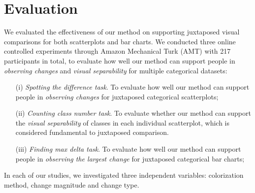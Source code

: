 \section {Evaluation}
\label{sec:results}

We evaluated the effectiveness of our method on supporting juxtaposed visual comparisons for both scatterplots and bar charts.%
We conducted three online controlled experiments through Amazon Mechanical Turk (AMT) with 217 participants in total, to evaluate how well our method can support people in \emph{observing changes} and \emph{visual separability} for multiple categorical datasets:
\begin{enumerate}
\item [(i)] \emph{Spotting the difference task}. To evaluate how well our method can support people in \emph{observing changes} for juxtaposed categorical scatterplots;
\item [(ii)] \emph{Counting class number task}. To evaluate whether our method can support the \emph{visual separability} of classes in each individual scatterplot, which is considered fundamental to juxtaposed comparison.
\item [(iii)] \emph{Finding max delta task}. To evaluate how well our method can support people in \emph{observing the largest change} for juxtaposed categorical bar charts;

\end{enumerate}

\vspace{.3em}
 In each of our studies, we investigated three independent variables: colorization method, change magnitude and change type.

